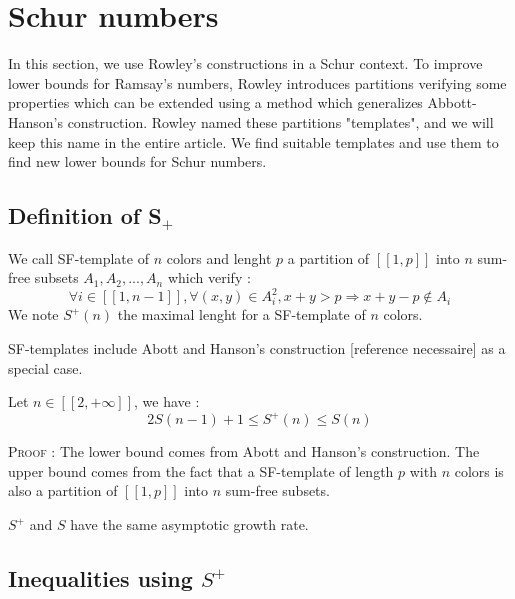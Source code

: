 \section{Schur numbers}

\qquad In this section, we use Rowley's constructions \cite{RowleyRamsey} in a Schur context. To improve lower bounds
for Ramsay's
numbers, Rowley
introduces partitions verifying some properties which can be extended using a method which generalizes Abbott-Hanson's
\cite{AbbottHanson} construction.
Rowley named these partitions "templates", and we will keep this name in the entire article. We find suitable templates
and use them
 to find new lower bounds for Schur numbers.

\subsection{Definition of S\(_+\)}

\begin{definition}
We call SF-template of \(n\) colors and lenght \(p\) a partition of \( [\![1,p]\!]\) into \(n\) sum-free subsets \(A_1,
A_2, ..., A_n\) which verify :
	\[
	\forall i \in [\![1, n-1]\!], \forall (x,y) \in A_i^2, x+y > p
	\Longrightarrow x+y-p \notin A_i
	\]
	We note \(S^+(n)\) the maximal lenght for a SF-template of \(n\) colors.
\end{definition}

\begin{remark}
	SF-templates include Abott and Hanson's construction [reference necessaire] as a special case.
\end{remark}

\begin{proposition}
	Let \(n \in [\![2, +\infty]\!]\), we have :
	\[
	2S(n-1)+1 \leqslant S^+(n) \leqslant S(n)
	\]
\end{proposition}

\textsc{Proof :} The lower bound comes from Abott and Hanson's construction. The upper bound comes
from the fact that a SF-template of length \(p\) with \(n\) colors is also a partition of
\([\![1, p]\!]\) into \(n\) sum-free subsets.

\begin{remark}
	\(S^+\) and \(S\) have the same asymptotic growth rate.
\end{remark}


\subsection{Inequalities using \(S^+\)}


